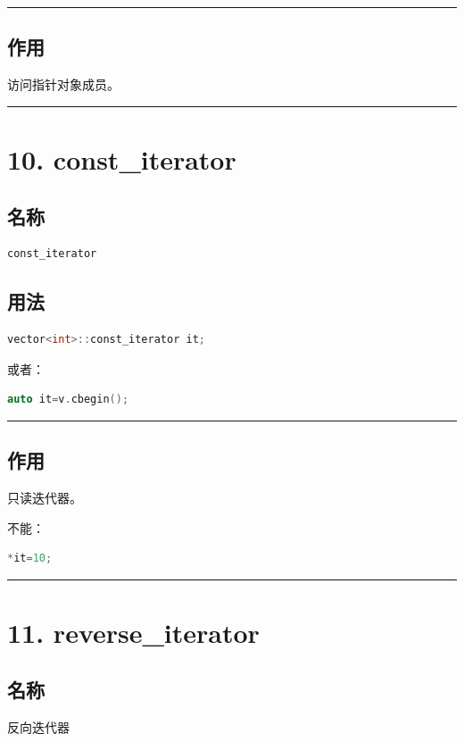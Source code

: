 \documentclass[10pt,twocolumn]{extarticle}
\begin{document}
\noindent\rule{\linewidth}{0.4pt}

\subsection{作用}
访问指针对象成员。

\noindent\rule{\linewidth}{0.4pt}

\section{10. const\_iterator}

\subsection{名称}
\begin{lstlisting}[language=C++]
const_iterator
\end{lstlisting}

\subsection{用法}
\begin{lstlisting}[language=C++]
vector<int>::const_iterator it;
\end{lstlisting}
或者：
\begin{lstlisting}[language=C++]
auto it=v.cbegin();
\end{lstlisting}

\noindent\rule{\linewidth}{0.4pt}

\subsection{作用}
只读迭代器。

不能：
\begin{lstlisting}[language=C++]
*it=10;
\end{lstlisting}

\noindent\rule{\linewidth}{0.4pt}

\section{11. reverse\_iterator}

\subsection{名称}
反向迭代器
\end{document}
